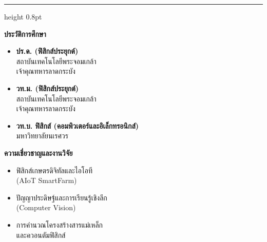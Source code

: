 \documentclass[11pt,twoside,openright]{book}
\begin{document}
\vspace{8pt}
{\color{rbruBorder}\hrule height 0.8pt}
\vspace{8pt}

\noindent
\begin{minipage}[t]{0.48\textwidth}
    {\fontsize{11}{14}\selectfont\bfseries\color{deepIndigo} ประวัติการศึกษา}\\[4pt]
    {\fontsize{9}{12}\selectfont
    \begin{itemize}[leftmargin=1.2em, itemsep=2pt]
        \item \textbf{ปร.ด. (ฟิสิกส์ประยุกต์)}\\สถาบันเทคโนโลยีพระจอมเกล้า\\เจ้าคุณทหารลาดกระบัง
        \item \textbf{วท.ม. (ฟิสิกส์ประยุกต์)}\\สถาบันเทคโนโลยีพระจอมเกล้า\\เจ้าคุณทหารลาดกระบัง
        \item \textbf{วท.บ. ฟิสิกส์ (คอมพิวเตอร์และอิเล็กทรอนิกส์)}\\มหาวิทยาลัยนเรศวร
    \end{itemize}}
\end{minipage}
\hfill
\begin{minipage}[t]{0.48\textwidth}
    {\fontsize{11}{14}\selectfont\bfseries\color{deepIndigo} ความเชี่ยวชาญและงานวิจัย}\\[4pt]
    {\fontsize{9}{12}\selectfont
    \begin{itemize}[leftmargin=1.2em, itemsep=2pt]
        \item ฟิสิกส์เกษตรดิจิทัลและไอโอที\\(AIoT SmartFarm)
        \item ปัญญาประดิษฐ์และการเรียนรู้เชิงลึก\\(Computer Vision)
        \item การคำนวณโครงสร้างสารแม่เหล็ก\\และควอนตัมฟิสิกส์
    \end{itemize}}
\end{minipage}
\end{document}
